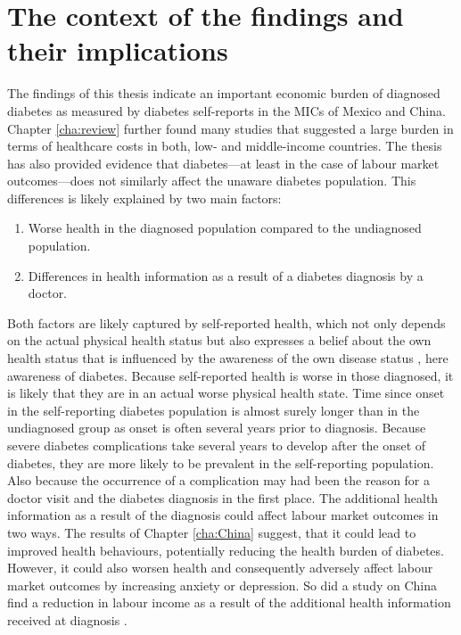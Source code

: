 \section{The context of the findings and their implications}

The findings of this thesis indicate an important economic burden of diagnosed diabetes as measured by diabetes self-reports in the \acp{MIC} of Mexico and China. Chapter \ref{cha:review} further found many studies that suggested a large burden in terms of healthcare costs in both, low- and middle-income countries. The thesis has also provided evidence that diabetes---at least in the case of labour market outcomes---does not similarly affect the unaware diabetes population. This differences is likely explained by two main factors: 

\begin{enumerate}
\item Worse health in the diagnosed population compared to the undiagnosed population.
\item Differences in health information as a result of a diabetes diagnosis by a doctor.
\end{enumerate}

Both factors are likely captured by self-reported health, which not only depends on the actual physical health status but also expresses a belief about the own health status that is influenced by the awareness of the own disease status \parencite{Jylha2009}, here awareness of diabetes. Because self-reported health is worse in those diagnosed, it is likely that they are in an actual worse physical health state. Time since onset in the self-reporting diabetes population is almost surely longer than in the undiagnosed group as onset is often several years prior to diagnosis. Because severe diabetes complications take several years to develop after the onset of diabetes, they are more likely to be prevalent in the self-reporting population. Also because the occurrence of a  complication may had been the reason for a doctor visit and the diabetes diagnosis in the first place. The additional health information as a result of the diagnosis could affect labour market outcomes in two ways. The results of Chapter \ref{cha:China} suggest, that it could lead to improved health behaviours, potentially reducing the health burden of diabetes. However, it could also worsen health and consequently adversely affect labour market outcomes by increasing anxiety or depression. So did a study on China find a reduction in labour income as a result of the additional health information received at diagnosis \parencite{Liu2014}. 

